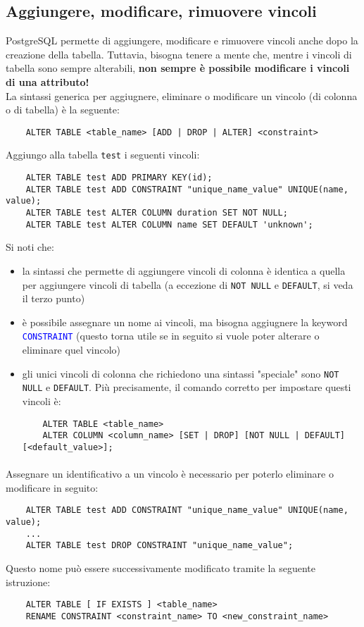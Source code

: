 \documentclass[12pt,a4paper]{book}
\begin{document}
	\subsection{Aggiungere, modificare, rimuovere vincoli}
	PostgreSQL permette di aggiungere, modificare e rimuovere vincoli anche dopo la creazione della tabella. Tuttavia, bisogna tenere a mente che, mentre i vincoli di tabella sono sempre alterabili, \textbf{non sempre è possibile modificare i vincoli di una attributo!}\\La sintassi generica per aggiugnere, eliminare o modificare un vincolo (di colonna o di tabella) è la seguente:
	\begin{lstlisting}
	ALTER TABLE <table_name> [ADD | DROP | ALTER] <constraint>
	\end{lstlisting}
	\begin{tcolorbox}[enhanced jigsaw, breakable,title=Esempio, title filled]
	Aggiungo alla tabella \texttt{test} i seguenti vincoli:
	\begin{lstlisting}
	ALTER TABLE test ADD PRIMARY KEY(id);
	ALTER TABLE test ADD CONSTRAINT "unique_name_value" UNIQUE(name, value);
	ALTER TABLE test ALTER COLUMN duration SET NOT NULL;
	ALTER TABLE test ALTER COLUMN name SET DEFAULT 'unknown';
	\end{lstlisting}
	\end{tcolorbox}
	Si noti che:
	\begin{itemize}
		\item la sintassi che permette di aggiungere vincoli di colonna è identica a quella per aggiungere vincoli di tabella (a eccezione di \texttt{NOT NULL} e \texttt{DEFAULT}, si veda il terzo punto)
		\item è possibile assegnare un nome ai vincoli, ma bisogna aggiugnere la keyword \textcolor{blue}{\texttt{CONSTRAINT}} (questo torna utile se in seguito si vuole poter alterare o eliminare quel vincolo)
		\item gli unici vincoli di colonna che richiedono una sintassi "speciale" sono \texttt{NOT NULL} e \texttt{DEFAULT}. Più precisamente, il comando corretto per impostare questi vincoli è:
	\begin{lstlisting}
	ALTER TABLE <table_name>
	ALTER COLUMN <column_name> [SET | DROP] [NOT NULL | DEFAULT] [<default_value>];
	\end{lstlisting}
	\end{itemize}
	\paragraph{}Assegnare un identificativo a un vincolo è necessario per poterlo eliminare o modificare in seguito:
	\begin{lstlisting}
	ALTER TABLE test ADD CONSTRAINT "unique_name_value" UNIQUE(name, value);
	...
	ALTER TABLE test DROP CONSTRAINT "unique_name_value";
	\end{lstlisting}
	Questo nome può essere successivamente modificato tramite la seguente istruzione:
	\begin{lstlisting}
	ALTER TABLE [ IF EXISTS ] <table_name>
	RENAME CONSTRAINT <constraint_name> TO <new_constraint_name>
	\end{lstlisting}
\end{document}
